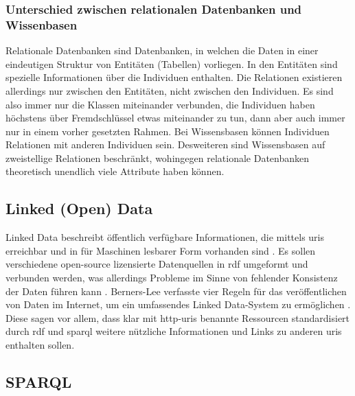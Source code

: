 \subsubsection{Unterschied zwischen relationalen Datenbanken und Wissenbasen}
Relationale Datenbanken sind Datenbanken, in welchen die Daten in einer eindeutigen Struktur von Entitäten (Tabellen) vorliegen.
In den Entitäten sind spezielle Informationen über die Individuen enthalten.
Die Relationen existieren allerdings nur zwischen den Entitäten, nicht zwischen den Individuen.
Es sind also immer nur die Klassen miteinander verbunden, die Individuen haben höchstens über Fremdschlüssel etwas miteinander zu tun, dann aber auch immer nur in einem vorher gesetzten Rahmen.
Bei Wissensbasen können Individuen Relationen mit anderen Individuen sein.
Desweiteren sind Wissensbasen auf zweistellige Relationen beschränkt, wohingegen relationale Datenbanken theoretisch unendlich viele Attribute haben können.

\subsection{Linked (Open) Data}

Linked Data beschreibt öffentlich verfügbare Informationen, die mittels \acp{uri} erreichbar und in für Maschinen lesbarer Form vorhanden sind \citep{linkeddata}.
Es sollen verschiedene open-source lizensierte Datenquellen in \ac{rdf} umgeformt und verbunden werden, was allerdings Probleme im Sinne von fehlender Konsistenz der Daten führen kann \citep{semanticwebreview}.
Berners-Lee verfasste vier Regeln für das veröffentlichen von Daten im Internet, um ein umfassendes Linked Data-System zu ermöglichen \citep{linkeddatadesignissues}.
Diese sagen vor allem, dass klar mit \ac{http}-\acp{uri} benannte Ressourcen standardisiert durch \ac{rdf} und \ac{sparql} weitere nützliche Informationen und Links zu anderen \acp{uri} enthalten sollen.

\subsection{SPARQL}\label{sub:sparql}

